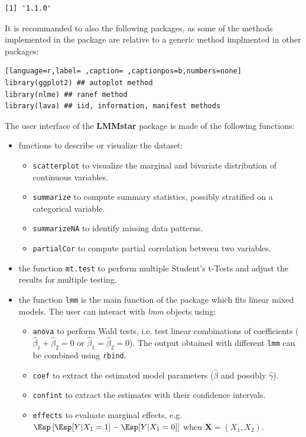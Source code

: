 \documentclass[12pt]{article}
\newcommand{\VX}{\boldsymbol{X}}
\begin{document}
\begin{verbatim}
[1] '1.1.0'
\end{verbatim}


It is recommanded to also the following packages, as some of the
methods implemented in the package are relative to a generic method
implmented in other packages:
\begin{lstlisting}[language=r,label= ,caption= ,captionpos=b,numbers=none]
library(ggplot2) ## autoplot method
library(nlme) ## ranef method
library(lava) ## iid, information, manifest methods
\end{lstlisting}

\clearpage

The user interface of the \textbf{LMMstar} package is made of the following
functions:
\begin{itemize}
\item functions to describe or visualize the dataset: 
\begin{itemize}
\item \texttt{scatterplot} to visualize the marginal and bivariate distribution of continuous variables.
\item \texttt{summarize} to compute summary statistics, possibly stratified on a categorical variable.
\item \texttt{summarizeNA} to identify missing data patterns.
\item \texttt{partialCor} to compute partial correlation between two variables.
\end{itemize}
\item the function \texttt{mt.test} to perform multiple Student's t-Tests and
adjust the results for multiple testing.
\item the function \texttt{lmm} is the main function of the package which fits
linear mixed models. The user can interact with \emph{lmm} objects using:
\begin{itemize}
\item \texttt{anova} to perform Wald tests, i.e. test linear combinations of
coefficients (\(\widehat{\beta}_1+\widehat{\beta}_2=0\) or
\(\widehat{\beta}_1=\widehat{\beta}_2=0\)). The output obtained
with different \texttt{lmm} can be combined using \texttt{rbind}.
\item \texttt{coef} to extract the estimated model parameters (\(\widehat{\beta}\) and possibly \(\widehat{\gamma}\)).
\item \texttt{confint} to extract the estimates with their confidence intervals.
\item \texttt{effects} to evaluate marginal effects, e.g. \(\Esp\left[\Esp[Y|X_1=1]-\Esp[Y|X_1=0]\right]\) when \(\VX=(X_1,X_2)\).

\end{itemize}
\end{itemize}
\end{document}
